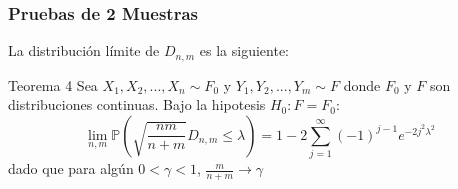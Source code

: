 \documentclass[aspectratio=169,spanish]{beamer}
\begin{document}
\begin{frame}
\frametitle{Pruebas de 2 Muestras}
La distribución límite de $D_{n,m}$ es la siguiente:
\begin{block}{Teorema 4}
Sea $X_1,X_2,...,X_n\sim F_0$ y $Y_1,Y_2,...,Y_m\sim F$ donde $F_0$ y $F$ son distribuciones continuas. Bajo la hipotesis $H_0: F=F_0$:
$$ \lim_{n,m} \mathbb{P}(\sqrt{\frac{nm}{n+m}}D_{n,m} \le \lambda) = 1-2\sum_{j=1}^{\infty}(-1)^{j-1}e^{-2j^2\lambda^2}$$
dado que para algún $0<\gamma <1$, $\frac{m}{n+m}\rightarrow \gamma$
\end{block}
\end{frame}
\end{document}
